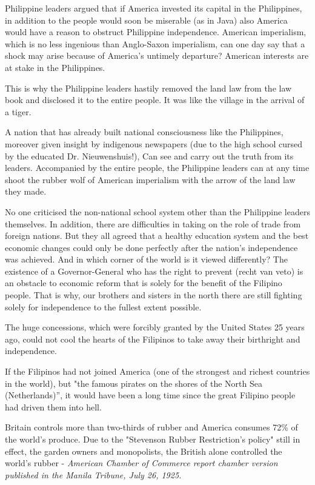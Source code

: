 Philippine leaders argued that if America invested its capital in the Philippines, in addition 
to the people would soon be miserable (as in Java) also America would have a reason to obstruct 
Philippine independence. American imperialism, which is no less ingenious than Anglo-Saxon imperialism, 
can one day say that a shock may arise because of America's untimely departure? American interests are at stake in the Philippines.\vskip 0.2in

This is why the Philippine leaders hastily removed the land law from the law book and disclosed it 
to the entire people. It was like the village in the arrival of a tiger.\vskip 0.2in

A nation that has already built national consciousness like the Philippines, moreover given 
insight by indigenous newspapers (due to the high school cursed by the educated Dr. Nieuwenshuis!), 
Can see and carry out the truth from its leaders. Accompanied by the entire people, the Philippine 
leaders can at any time shoot the rubber wolf of American imperialism with the arrow of the land law they made.\vskip 0.2in

No one criticised the non-national school system other than the Philippine leaders themselves. 
In addition, there are difficulties in taking on the role of trade from foreign nations. But they 
all agreed that a healthy education system and the best economic changes could only be done 
perfectly after the nation's independence was achieved. And in which corner of the world is it 
viewed differently? The existence of a Governor-General who has the right to prevent (recht van veto) 
is an obstacle to economic reform that is solely for the benefit of the Filipino people. That is why, 
our brothers and sisters in the north there are still fighting solely for independence to the fullest extent possible.\vskip 0.2in

The huge concessions, which were forcibly granted by the United States 25 years ago, 
could not cool the hearts of the Filipinos to take away their birthright and independence.\vskip 0.2in

If the Filipinos had not joined America (one of the strongest and richest countries in the world), 
but "the famous pirates on the shores of the North Sea (Netherlands)”, it would have been a long time 
since the great Filipino people had driven them into hell.\vskip 0.2in

Britain controls more than two-thirds of rubber and America consumes 72\% of the world's produce. 
Due to the "Stevenson Rubber Restriction's policy" still in effect, the garden owners and monopolists, 
the British alone controlled the world's rubber - \emph{American Chamber of Commerce report chamber version 
published in the Manila Tribune, July 26, 1925.}\vskip 0.2in

